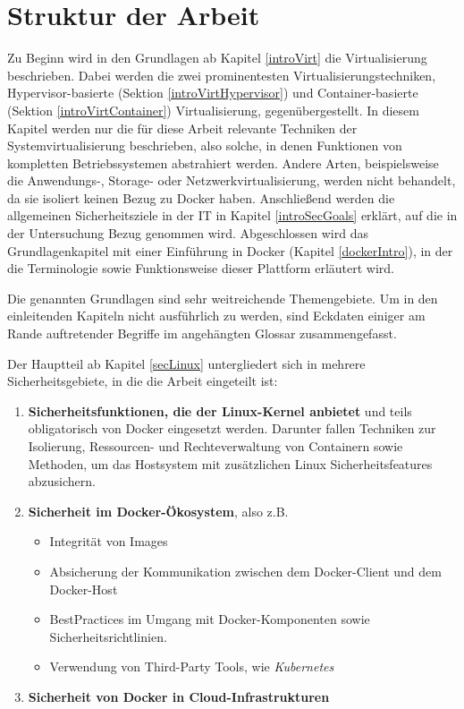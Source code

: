 \documentclass[../main.tex]{subfiles}
\begin{document}
  \section{Struktur der Arbeit}
    Zu Beginn wird in den Grundlagen ab Kapitel \ref{introVirt} die Virtualisierung beschrieben. Dabei werden die zwei prominentesten Virtualisierungstechniken, Hypervisor-basierte (Sektion \ref{introVirtHypervisor}) und Container-basierte (Sektion \ref{introVirtContainer}) Virtualisierung, gegenübergestellt. In diesem Kapitel werden nur die für diese Arbeit relevante Techniken der Systemvirtualisierung beschrieben, also solche, in denen Funktionen von kompletten Betriebssystemen abstrahiert werden. Andere Arten, beispielsweise die Anwendungs-, Storage- oder Netzwerkvirtualisierung, werden nicht behandelt, da sie isoliert keinen Bezug zu Docker haben. Anschließend werden die allgemeinen Sicherheitsziele in der \acrshort{IT} in Kapitel \ref{introSecGoals} erklärt, auf die in der Untersuchung Bezug genommen wird. Abgeschlossen wird das Grundlagenkapitel mit einer Einführung in Docker (Kapitel \ref{dockerIntro}), in der die Terminologie sowie Funktionsweise dieser Plattform erläutert wird.

    Die genannten Grundlagen sind sehr weitreichende Themengebiete. Um in den einleitenden Kapiteln nicht ausführlich zu werden, sind Eckdaten einiger am Rande auftretender Begriffe im angehängten Glossar zusammengefasst.

    Der Hauptteil ab Kapitel \ref{secLinux} untergliedert sich in mehrere Sicherheitsgebiete, in die die Arbeit eingeteilt ist:
    \begin{enumerate}
      \item \textbf{Sicherheitsfunktionen, die der Linux-Kernel anbietet} und teils obligatorisch von Docker eingesetzt werden. Darunter fallen Techniken zur Isolierung, Ressourcen- und Rechteverwaltung von Containern sowie Methoden, um das Hostsystem mit zusätzlichen Linux Sicherheitsfeatures abzusichern.
      \item \textbf{Sicherheit im Docker-Ökosystem}, also z.B.
        \begin{itemize}
          \item Integrität von Images
          \item Absicherung der Kommunikation zwischen dem Docker-Client und dem Docker-Host
          \item \glspl{BestPractice} im Umgang mit Docker-Komponenten sowie Sicherheitsrichtlinien.
          \item Verwendung von Third-Party Tools, wie \emph{Kubernetes} %
        \end{itemize}
      \item \textbf{Sicherheit von Docker in Cloud-Infrastrukturen}
    \end{enumerate}
\end{document}
